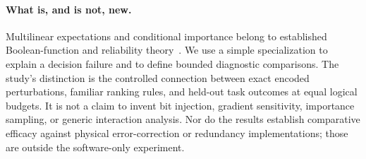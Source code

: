 \paragraph{What is, and is not, new.}
Multilinear expectations and conditional importance belong to established Boolean-function and reliability theory~\cite{odonnell2014analysis,rauzy2022reliability}. We use a simple specialization to explain a decision failure and to define bounded diagnostic comparisons. The study's distinction is the controlled connection between exact encoded perturbations, familiar ranking rules, and held-out task outcomes at equal logical budgets. It is not a claim to invent bit injection, gradient sensitivity, importance sampling, or generic interaction analysis. Nor do the results establish comparative efficacy against physical error-correction or redundancy implementations; those are outside the software-only experiment.
